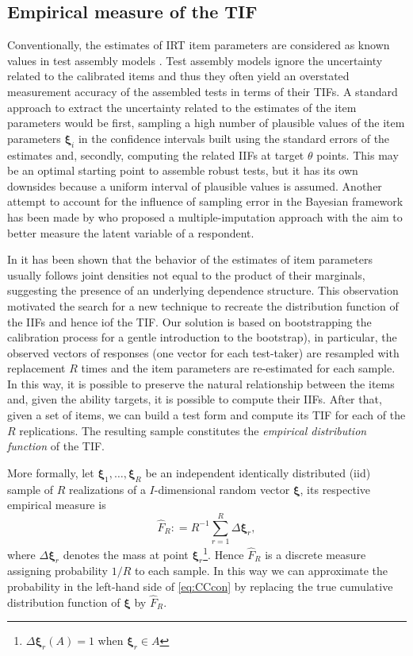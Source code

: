 \subsection{Empirical measure of the TIF}\label{sec:edfTIF}

Conventionally, the estimates of IRT item parameters are considered as known values in test assembly models \parencite{VDL2005}. Test assembly models ignore the uncertainty related to the calibrated items and thus they often yield an overstated measurement accuracy of the assembled tests in terms of their TIFs.
A standard approach to extract the uncertainty related to the estimates of the item parameters would be first, sampling a high number of plausible values of the item parameters $\boldsymbol{\xi}_i$ in the confidence intervals built using the standard errors of the estimates and, secondly, computing the related IIFs at target $\theta$ points. This may be an optimal starting point to assemble robust tests, \parencite[see][]{veldkamp2013uncertainties, veldkamp2013application} but it has its own downsides because a uniform interval of plausible values is assumed. Another attempt to account for the influence of sampling error in the Bayesian framework has been made by \textcite{Yang2012} who proposed a multiple-imputation approach with the aim to better measure the latent variable of a respondent. 

In \textcite{matteucci2012prior} it has been shown that the behavior of the estimates of item parameters usually follows joint densities not equal to the product of their marginals, suggesting the presence of an underlying dependence structure. This observation motivated the search for a new technique to recreate the distribution function of the IIFs and hence iof the TIF. Our solution is based on bootstrapping the calibration process \parencite[see][]{efron1993} for a gentle introduction to the bootstrap), in particular, the observed vectors of responses (one vector for each test-taker) are resampled with replacement $R$ times and the item parameters are re-estimated for each sample. In this way, it is possible to preserve the natural relationship between the items and, given the ability targets, it is possible to compute their IIFs. After that, given a set of items, we can build a test form and compute its TIF for each of the $R$ replications. The resulting sample constitutes the \emph{empirical distribution function} of the TIF. 

More formally, let $\boldsymbol{\xi}_1, \ldots, \boldsymbol{\xi}_R$ be an independent identically distributed (iid) sample of $R$ realizations of a $I$-dimensional random vector $\boldsymbol{\xi}$, its respective empirical measure is 
$$\hat{F}_R : = R^{-1} \sum_{r=1}^R \Delta\boldsymbol{\xi}_r,$$
\noindent where $\Delta\boldsymbol{\xi}_r$ denotes the mass at point $\boldsymbol{\xi}_r$\footnote{$\Delta\boldsymbol{\xi}_r(A)=1$ when $\boldsymbol{\xi}_r\in A$}. Hence $\hat{F}_R$ is a discrete measure assigning probability $1/R$ to each sample. In this way we can approximate the probability in the left-hand side of \eqref{eq:CCcon} by replacing the true cumulative distribution function of $\boldsymbol{\xi}$ by $\hat{F}_R$. 

